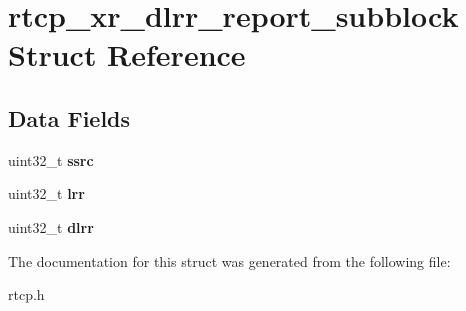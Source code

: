 \section{rtcp\+\_\+xr\+\_\+dlrr\+\_\+report\+\_\+subblock Struct Reference}
\label{structrtcp__xr__dlrr__report__subblock}
\subsection*{Data Fields}
\begin{DoxyCompactItemize}
\item 
\mbox{\label{structrtcp__xr__dlrr__report__subblock_a64cc0789af409d13a758d5b7af36af87}} 
uint32\+\_\+t {\bfseries ssrc}
\item 
\mbox{\label{structrtcp__xr__dlrr__report__subblock_a9727af016c7b84b8dc03d4beae1bce2d}} 
uint32\+\_\+t {\bfseries lrr}
\item 
\mbox{\label{structrtcp__xr__dlrr__report__subblock_a87ad6c16e50f2c2df1f5ffe17644b975}} 
uint32\+\_\+t {\bfseries dlrr}
\end{DoxyCompactItemize}


The documentation for this struct was generated from the following file\+:\begin{DoxyCompactItemize}
\item 
rtcp.\+h\end{DoxyCompactItemize}
